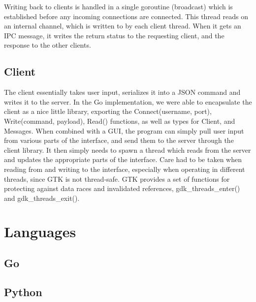 \documentclass[10pt, letterpaper]{article}
\begin{document}
Writing back to clients is handled in a single goroutine (broadcast) 
which is established before any incoming connections are connected. 
This thread reads on an internal channel, which is written to by each 
client thread. When it gets an IPC message, it writes the return status 
to the requesting client, and the response to the other clients.

\subsection*{Client}

The client essentially takes user input, serializes it into a JSON 
command and writes it to the server. In the Go implementation, we were 
able to encapsulate the client as a nice little library, exporting the 
Connect(username, port), Write(command, payload), Read() functions, as 
well as types for Client, and Messages. When combined with a GUI, the 
program can simply pull user input from various parts of the interface, 
and send them to the server through the client library. It then simply 
needs to spawn a thread which reads from the server and updates the 
appropriate parts of the interface. Care had to be taken when reading 
from and writing to the interface, especially when operating in 
different threads, since GTK is not thread-safe. GTK provides a set of 
functions for protecting against data races and invalidated references, 
gdk_threads_enter() and gdk_threads_exit().

\section*{Languages}



\subsection*{Go}

\subsection*{Python}
\end{document}
